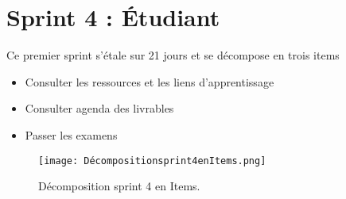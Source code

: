 \section{Sprint 4 : Étudiant}
\label{sec:conception}

\begin{fquote}
	Ce premier sprint s’étale sur 21 jours et se décompose en trois items
\end{fquote}
\smallskip
\begin{itemize}[label=$\diamond$]
	\item Consulter les ressources et les liens d'apprentissage
	
	\item Consulter agenda des livrables
	
	\item Passer les examens
	
\end{itemize}
\medskip
\medskip
\medskip
\medskip
\medskip
\medskip
\medskip
\medskip
\medskip
\medskip
\begin{figure}[ht]
	\centering
	\texttt{[image: Décompositionsprint4enItems.png]}
	\caption{Décomposition sprint 4 en Items.}
	\label{fig:Démposition sprint 4 en Items}
\end{figure}
\FloatBarrier
\clearpage



